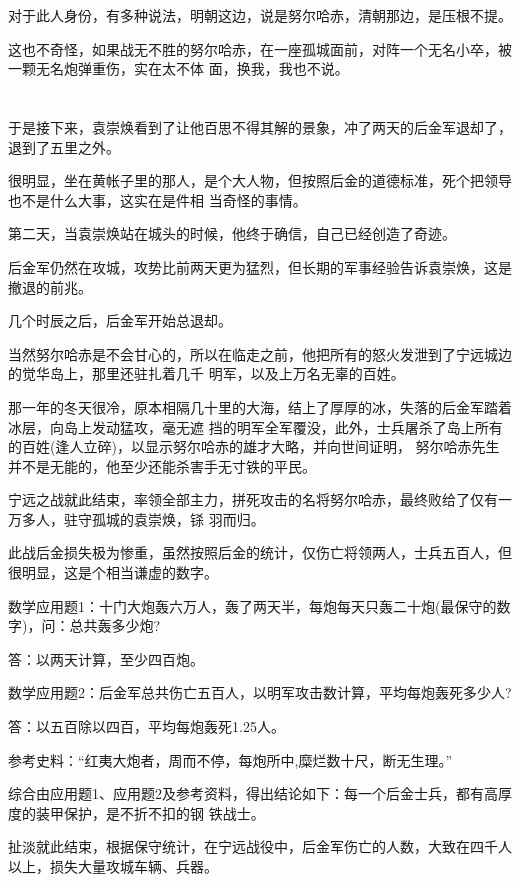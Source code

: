 \documentclass[11pt,a4paper,onecolumn]{article}
\begin{document}
对于此人身份，有多种说法，明朝这边，说是努尔哈赤，清朝那边，是压根不提。

这也不奇怪，如果战无不胜的努尔哈赤，在一座孤城面前，对阵一个无名小卒，被一颗无名炮弹重伤，实在太不体
面，换我，我也不说。

\section[\thesection]{}

于是接下来，袁崇焕看到了让他百思不得其解的景象，冲了两天的后金军退却了，退到了五里之外。

很明显，坐在黄帐子里的那人，是个大人物，但按照后金的道德标准，死个把领导也不是什么大事，这实在是件相
当奇怪的事情。

第二天，当袁崇焕站在城头的时候，他终于确信，自己已经创造了奇迹。

后金军仍然在攻城，攻势比前两天更为猛烈，但长期的军事经验告诉袁崇焕，这是撤退的前兆。

几个时辰之后，后金军开始总退却。

当然努尔哈赤是不会甘心的，所以在临走之前，他把所有的怒火发泄到了宁远城边的觉华岛上，那里还驻扎着几千
明军，以及上万名无辜的百姓。

那一年的冬天很冷，原本相隔几十里的大海，结上了厚厚的冰，失落的后金军踏着冰层，向岛上发动猛攻，毫无遮
挡的明军全军覆没，此外，士兵屠杀了岛上所有的百姓(逢人立碎)，以显示努尔哈赤的雄才大略，并向世间证明，
努尔哈赤先生并不是无能的，他至少还能杀害手无寸铁的平民。

宁远之战就此结束，率领全部主力，拼死攻击的名将努尔哈赤，最终败给了仅有一万多人，驻守孤城的袁崇焕，铩
羽而归。

此战后金损失极为惨重，虽然按照后金的统计，仅伤亡将领两人，士兵五百人，但很明显，这是个相当谦虚的数字。

数学应用题1：十门大炮轰六万人，轰了两天半，每炮每天只轰二十炮(最保守的数字)，问：总共轰多少炮?

答：以两天计算，至少四百炮。

数学应用题2：后金军总共伤亡五百人，以明军攻击数计算，平均每炮轰死多少人?

答：以五百除以四百，平均每炮轰死1.25人。

参考史料：``红夷大炮者，周而不停，每炮所中,糜烂数十尺，断无生理。''

综合由应用题1、应用题2及参考资料，得出结论如下：每一个后金士兵，都有高厚度的装甲保护，是不折不扣的钢
铁战士。

扯淡就此结束，根据保守统计，在宁远战役中，后金军伤亡的人数，大致在四千人以上，损失大量攻城车辆、兵器。
\end{document}
